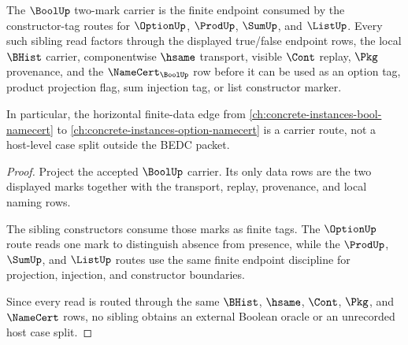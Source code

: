 \begin{theorem}
\label{thm:bool-finite-data-sibling-route}
The $\BoolUp$ two-mark carrier is the finite endpoint consumed by the constructor-tag routes for $\OptionUp$, $\ProdUp$, $\SumUp$, and $\ListUp$. Every such sibling read factors through the displayed true/false endpoint rows, the local $\BHist$ carrier, componentwise $\hsame$ transport, visible $\Cont$ replay, $\Pkg$ provenance, and the $\NameCert_{\BoolUp}$ row before it can be used as an option tag, product projection flag, sum injection tag, or list constructor marker.

In particular, the horizontal finite-data edge from \autoref{ch:concrete-instances-bool-namecert} to \autoref{ch:concrete-instances-option-namecert} is a carrier route, not a host-level case split outside the BEDC packet.
\end{theorem}
\begin{proof}
Project the accepted $\BoolUp$ carrier. Its only data rows are the two displayed marks together with the transport, replay, provenance, and local naming rows.

The sibling constructors consume those marks as finite tags. The $\OptionUp$ route reads one mark to distinguish absence from presence, while the $\ProdUp$, $\SumUp$, and $\ListUp$ routes use the same finite endpoint discipline for projection, injection, and constructor boundaries.

Since every read is routed through the same $\BHist$, $\hsame$, $\Cont$, $\Pkg$, and $\NameCert$ rows, no sibling obtains an external Boolean oracle or an unrecorded host case split.
\end{proof}
